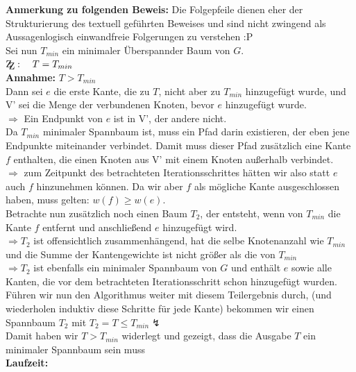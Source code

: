 \documentclass[10pt,a4paper]{article}
\newcommand{\zz}{\mathrm{Z\kern-.3em\raise-0.5ex\hbox{Z}}}
\begin{document}
\begin{itemize}
                    \textbf{Anmerkung zu folgenden Beweis: } 
                    Die Folgepfeile dienen eher der Strukturierung des textuell geführten Beweises
                    und sind nicht zwingend als Aussagenlogisch einwandfreie Folgerungen zu verstehen :P\\
                    
                    Sei nun $T_{min}$ ein minimaler Überspannder Baum von $G$.\\
                    $\zz: \quad T = T_{min}$\\
                    \textbf{Annahme:} $T > T_{min}$ \\
                    Dann sei $e$ die erste Kante, die zu $T$, nicht aber zu $T_{min}$ hinzugefügt wurde,
                    und V' sei die Menge der verbundenen Knoten, bevor $e$ hinzugefügt wurde.
                    \\ $\Rightarrow$ Ein Endpunkt von $e$ ist in V', der andere nicht.
                    \\ Da $T_{min}$ minimaler Spannbaum ist, muss ein Pfad darin existieren,
                    der eben jene Endpunkte miteinander verbindet. Damit muss dieser Pfad zusätzlich
                    eine Kante $f$ enthalten, die einen Knoten aus V' mit einem Knoten außerhalb
                    verbindet.
                    \\$\Rightarrow$ zum Zeitpunkt des betrachteten Iterationsschrittes
                    hätten wir also statt $e$ auch $f$ hinzunehmen können.
                    Da wir aber $f$ als mögliche Kante ausgeschlossen haben, muss gelten:
                    $w(f) \geq w(e)$. \\
                    Betrachte nun zusätzlich noch einen Baum $T_2$, der entsteht, wenn von
                    $T_{min}$ die Kante $f$ entfernt und anschließend $e$ hinzugefügt wird.
                    \\ $\Rightarrow T_2$ ist offensichtlich zusammenhängend, hat die selbe Knotenanzahl
                    wie $T_{min}$ und die Summe der Kantengewichte ist nicht größer als die von $T_{min}$
                    \\ $\Rightarrow T_2$ ist ebenfalls ein minimaler Spannbaum von $G$ und enthält
                    $e$ sowie alle Kanten, die vor dem betrachteten Iterationsschritt schon
                    hinzugefügt wurden. Führen wir nun den Algorithmus weiter mit diesem Teilergebnis
                    durch, (und wiederholen induktiv diese Schritte für jede Kante) bekommen wir einen
                    Spannbaum $T_2$ mit $T_2 = T \leq T_{min} \lightning$
                    \\
                    Damit haben wir $T > T_{min}$ widerlegt und gezeigt, dass die Ausgabe
                    $T$ ein minimaler Spannbaum sein muss\\
                    
                    \textbf{Laufzeit: } \\
                    
                    
            
    \end{itemize}
\end{document}
